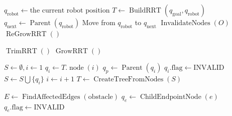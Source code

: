\begin{algorithm}[ht!]
    \caption{$\operatorname{DRRT}()$}
    \label{alg:drrt}
    \begin{algorithmic}[1]
        \STATE \(q_{\text{robot}} \leftarrow \text{the current robot position}\)
        \STATE \(T \leftarrow \operatorname{BuildRRT}(q_{\text{goal}},q_{\text{robot}})\)
            \STATE \(q_{\text{next}}  \leftarrow \operatorname{Parent}(q_{\text{robot}})\)
            \STATE Move from \(q_{\text{robot}}\) to \(q_{\text{next}}\)
                \STATE \(\operatorname{InvalidateNodes}(O)\)
            \ENDFOR
                \STATE \(\operatorname{ReGrowRRT}()\)
            \ENDIF
        \ENDWHILE
    \end{algorithmic}
\end{algorithm}

\begin{algorithm}[ht!]
\caption{$\operatorname{ReGrowRRT}()$}
\label{alg:regrowrrt}
\begin{algorithmic}[1]
    \STATE \(\operatorname{TrimRRT}()\)
    \STATE \(\operatorname{GrowRRT}()\)
\end{algorithmic}
\end{algorithm}

\begin{algorithm}[ht!]
\caption{$\operatorname{TrimRRT}()$}
\label{alg:trimrrt}
\begin{algorithmic}[1]
    \STATE \(S \leftarrow \emptyset, i \leftarrow 1\)
        \STATE \(q_i \leftarrow  T.\operatorname{node}(i)\)
        \STATE \(q_p \leftarrow  \operatorname{Parent}(q_i)\)
            \STATE \(q_i.\text{flag} \leftarrow  \text{INVALID}\)
        \ENDIF
            \STATE \(S \leftarrow  S \bigcup \{q_i\}\)
        \ENDIF
        \STATE \(i \leftarrow i+1\)
    \ENDWHILE
    \STATE \(T \leftarrow  \operatorname{CreateTreeFromNodes}(S)\)
\end{algorithmic}
\end{algorithm}


\begin{algorithm}[ht!]
\caption{$\operatorname{InvalidateNodes}(obstacle)$}
\label{alg:invalidatenodes}
\begin{algorithmic}[1]
    \STATE \(E \leftarrow \operatorname{FindAffectedEdges}(\text{obstacle})\)
        \STATE \(q_e \leftarrow  \operatorname{ChildEndpointNode}(e)\)
        \STATE \(q_e.\text{flag} \leftarrow  \text{INVALID}\)
    \ENDFOR
\end{algorithmic}
\end{algorithm}

